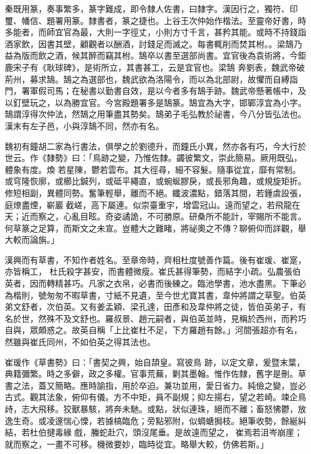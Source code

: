 \begin{pinyinscope}
 秦既用篆，奏事繁多，篆字難成，即令隸人佐書，曰隸字。漢因行之，獨符、印璽、幡信、題署用篆。隸書者，篆之捷也。上谷王次仲始作楷法。至靈帝好書，時多能者，而師宜官為最，大則一字徑丈，小則方寸千言，甚矜其能。或時不持錢詣酒家飲，因書其壁，顧觀者以酬酒，討錢足而滅之。每書輒削而焚其柎。。梁鵠乃益為版而飲之酒，候其醉而竊其柎。鵠卒以書至選部尚書。宜官後為袁術將，今鉅鹿宋子有《耿球碑》，是術所立，其書甚工，云是宜官也。梁鵠
 奔劉表，魏武帝破荊州，募求鵠。鵠之為選部也，魏武欲為洛陽令，而以為北部尉，故懼而自縛詣門，署軍假司馬；在秘書以勤書自效，是以今者多有鵠手跡。魏武帝懸著帳中，及以釘壁玩之，以為勝宜官。今宮殿題署多是鵠篆。鵠宜為大字，邯鄲淳宜為小字。鵠謂淳得次仲法，然鵠之用筆盡其勢矣。鵠弟子毛弘教於祕書，今八分皆弘法也。漢末有左子邑，小與淳鵠不同，然亦有名。



 魏初有鐘胡二家為行書法，俱學之於劉德升，而鐘氏小異，然亦各有巧，今大行於世云。作《隸勢》曰：「鳥跡之變，乃惟佐隸。蠲彼繁文，崇此簡易。厥用既弘，體象有度。煥
 若星陳，鬱若雲布。其大徑尋，細不容髮。隨事從宜，靡有常制。或穹隆恢廓，或櫛比鍼列，或砥平繩直，或蜿蜒膠戾，或長邪角趣，或規旋矩折。修短相副，異體同勢。奮筆輕舉，離而不絕。纖波濃點，錯落其間，若鍾虡設張，庭燎盡煙，嶄巖截嵯，高下屬連。似崇臺重宇，增雲冠山。遠而望之，若飛龍在天；近而察之，心亂目眩。奇姿譎詭，不可勝原。研桑所不能計，宰賜所不能言。何草篆之足算，而斯文之未宣。豈體大之難睹，將祕奧之不傳？聊俯仰而詳觀，舉大較而論旃。」



 漢興而有草書，不知作者姓名。至章帝時，齊相杜度號善作篇。後有崔瑗、崔寔，亦皆稱工，
 杜氏殺字甚安，而書體微瘦。崔氏甚得筆勢，而結字小疏。弘農張伯英者，因而轉精甚巧。凡家之衣帛，必書而後練之。臨池學書，池水盡黑。下筆必為楷則，號匆匆不暇草書，寸紙不見遺，至今世尤寶其書，韋仲將謂之草聖。伯英弟文舒者，次伯英。又有姜孟穎、梁孔達，田彥和及韋仲將之徒，皆伯英弟子，有名於世，然殊不及文舒也。羅叔景、趙元嗣者，與伯英並時，見稱於西州，而矜巧自與，眾頗惑之。故英自稱「上比崔杜不足，下方羅趙有餘。」河間張超亦有名，然雖與崔氏同州，不如伯英之得其法也。



 崔瑗作《草書勢》曰：「書契之興，始自頡皇。寫彼鳥
 跡，以定文章，爰暨末葉，典籍彌繁。時之多僻，政之多權。官事荒蕪，剿其墨翰。惟作佐隸，舊字是刪。草書之法，蓋又簡略。應時諭指，用於卒迫。兼功並用，愛日省力。純儉之變，豈必古式。觀其法象，俯仰有儀。方不中矩，員不副規；抑左揚右，望之若崎。竦企鳥歭，志大飛移。狡獸暴駭，將奔未馳。或點，狀似連珠，絕而不離；畜怒怫鬱，放逸生奇。或凌邃惴心慄，若據槁臨危；旁點邪附，似蜩螗挶枝。絕筆收勢，餘綖糾結，若杜伯揵毒緣戲，螣蛇赴穴，頭沒尾垂。是故遠而望之，崔焉若沮岑崩崖；就而察之，一畫不可移。機微要妙，臨時從宜。略舉大較，仿佛若斯。」




\end{pinyinscope}
